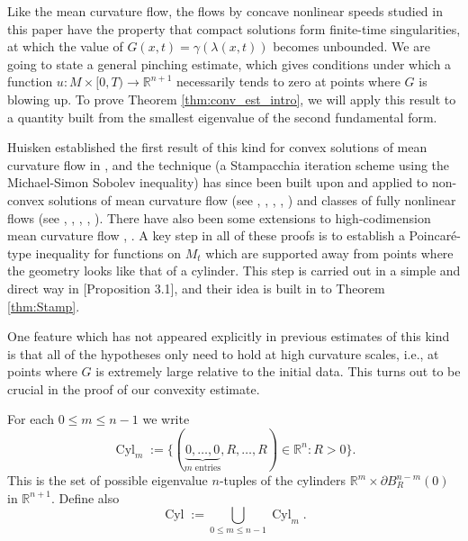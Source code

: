 \documentclass[12pt]{amsart}
\DeclareMathOperator{\Cyl}{Cyl}
\begin{document}
Like the mean curvature flow, the flows by concave nonlinear speeds studied in this paper have the property that compact solutions form finite-time singularities, at which the value of $G(x,t) = \gamma(\lambda(x,t))$ becomes unbounded. We are going to state a general pinching estimate, which gives conditions under which a function $u:M\times[0,T) \to \mathbb{R}^{n+1}$ necessarily tends to zero at points where $G$ is blowing up. To prove Theorem \ref{thm:conv_est_intro}, we will apply this result to a quantity built from the smallest eigenvalue of the second fundamental form.

Huisken established the first result of this kind for convex solutions of mean curvature flow in \cite{Huisk84}, and the technique (a Stampacchia iteration scheme using the Michael-Simon Sobolev inequality) has since been built upon and applied to non-convex solutions of mean curvature flow (see \cite{Huisk-Sin99}, \cite{Huisk-Sin99a}, \cite{Huisk-Sin09}, \cite{Brendle15}, \cite{Lang17}) and classes of fully nonlinear flows (see \cite{ALM14}, \cite{And-Lang-McCoy15}, \cite{And-Lang_cyl}, \cite{Bren-Huisk17}, \cite{Lang-Lyn19}). There have also been some extensions to high-codimension mean curvature flow \cite{Andrews-Baker}, \cite{Lynch-Nguyen}. A key step in all of these proofs is to establish a Poincar\'{e}-type inequality for functions on $M_t$ which are supported away from points where the geometry looks like that of a cylinder. This step is carried out in a simple and direct way in \cite{Bren-Huisk17}[Proposition 3.1], and their idea is built in to Theorem \ref{thm:Stamp}.

One feature which has not appeared explicitly in previous estimates of this kind is that all of the hypotheses only need to hold at high curvature scales, i.e., at points where $G$ is extremely large relative to the initial data. This turns out to be crucial in the proof of our convexity estimate.

For each $0 \leq m \leq n-1$ we write 
\[\Cyl_m := \{ (\underbrace{0,\dots,0}_{m \text{ entries}}, R, \dots, R) \in \mathbb{R}^n: R> 0 \}.\]
This is the set of possible eigenvalue $n$-tuples of the cylinders $\mathbb{R}^m \times \partial B_R^{n-m}(0)$ in $\mathbb{R}^{n+1}$. Define also
\[\Cyl := \bigcup_{0 \leq m \leq n-1} \Cyl_m.\]
\end{document}
